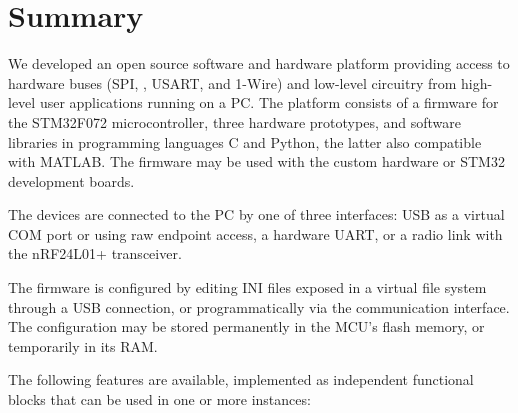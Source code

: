 \chapter{Summary}

We developed an open source software and hardware platform providing access to hardware buses (SPI, \IIC, USART, and 1-Wire) and low-level circuitry from high-level user applications running on a \gls{PC}. The platform consists of a firmware for the STM32F072 microcontroller, three hardware prototypes, and software libraries in programming languages C and Python, the latter also compatible with MATLAB. The firmware may be used with the custom hardware or STM32 development boards.

The devices are connected to the \gls{PC} by one of three interfaces: \gls{USB} as a virtual COM port or using raw endpoint access, a hardware \gls{UART}, or a radio link with the nRF24L01+ transceiver.

The firmware is configured by editing INI files exposed in a virtual file system through a \gls{USB} connection, or programmatically via the communication interface. The configuration may be stored permanently in the \gls{MCU}'s flash memory, or temporarily in its \gls{RAM}.

\noindent
The following features are available, implemented as independent functional blocks that can be used in one or more instances: 

